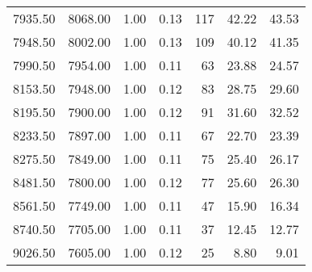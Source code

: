 \begin{table}
\begin{tabular}{rrrrrrr}
7935.50 & 8068.00 & 1.00 & 0.13 & 117 & 42.22 & 43.53 \\
7948.50 & 8002.00 & 1.00 & 0.13 & 109 & 40.12 & 41.35 \\
7990.50 & 7954.00 & 1.00 & 0.11 & 63 & 23.88 & 24.57 \\
8153.50 & 7948.00 & 1.00 & 0.12 & 83 & 28.75 & 29.60 \\
8195.50 & 7900.00 & 1.00 & 0.12 & 91 & 31.60 & 32.52 \\
8233.50 & 7897.00 & 1.00 & 0.11 & 67 & 22.70 & 23.39 \\
8275.50 & 7849.00 & 1.00 & 0.11 & 75 & 25.40 & 26.17 \\
8481.50 & 7800.00 & 1.00 & 0.12 & 77 & 25.60 & 26.30 \\
8561.50 & 7749.00 & 1.00 & 0.11 & 47 & 15.90 & 16.34 \\
8740.50 & 7705.00 & 1.00 & 0.11 & 37 & 12.45 & 12.77 \\
9026.50 & 7605.00 & 1.00 & 0.12 & 25 & 8.80 & 9.01 \\
\bottomrule
\end{tabular}
\end{table}
